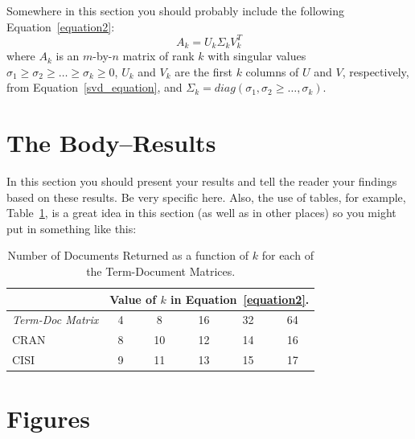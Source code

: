 \documentclass{IEEEtran}
\begin{document}
Somewhere in this section you should probably include the following Equation~\ref{equation2}:
\begin{equation}
\label{equation2}
A_k = U_k \Sigma_k V_k^T
\end{equation}
where $A_k$ is an $m$-by-$n$ matrix of rank $k$ with singular values $\sigma_1 \ge \sigma_2 \ge \ldots \ge \sigma_k \ge 0$, $U_k$ and $V_k$ are the first $k$ columns of $U$ and $V$, respectively, from Equation~\ref{svd_equation}, and $\Sigma_k = diag(\sigma_1,\sigma_2 \ge \ldots, \sigma_k)$.




\section{The Body--Results}

In this section you should present your results and tell the reader your findings based on these results.  Be very specific here.  Also, the use of tables, for example, Table~\ref{mytable}, is a great idea in this section (as well as in other places) so you might put in something like this:

\begin{table}[ht]
\begin{center}
\begin{tabular}{|l||c|c|c|c|c|} \hline
              &\multicolumn{5}{|c|}{Value of $k$ in
                                    Equation~\ref{equation2}.}\\ \hline
{\em Term-Doc Matrix} &  4 & 8 & 16 & 32 & 64 \\ \hline\hline
     CRAN             &  8 &10 & 12 & 14 & 16 \\ \hline
     CISI             &  9 &11 & 13 & 15 & 17 \\ \hline
\end{tabular}
\caption{\label{table:docs_returned} Number of Documents Returned as a
function of $k$ for each of the Term-Document Matrices.}
\end{center}
\label{mytable}
\end{table}


\newpage
\section{Figures}
\end{document}
